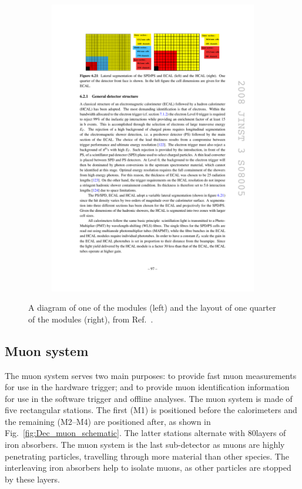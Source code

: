 \begin{figure}[!h]
\begin{subfigure}[t]{0.4\textwidth}
        \includegraphics[width=1.0\textwidth]{figs/Detector/hcal_layout.pdf}
    \end{subfigure}
    \caption{A diagram of one of the \hcal modules (left) and the layout of one quarter of the \hcal modules (right), from Ref.~\cite{Alves:2008zz}.}
    \label{fig:Dec_hcal_layout}   
\end{figure}

\subsection{Muon system}


The muon system serves two main purposes: to provide fast muon \pt measurements for use in the hardware trigger; and to provide muon identification information for use in the software trigger and offline analyses.
The muon system is made of five rectangular stations. The first (M1) is positioned before the calorimeters and the remaining (M2--M4) are positioned after, as shown in Fig.~\ref{fig:Dec_muon_schematic}. The latter stations alternate with 80\cm layers of iron absorbers. The muon system is the last sub-detector as muons are highly penetrating particles, travelling through more material than other species. The interleaving iron absorbers help to isolate muons, as other particles are stopped by these layers. 

